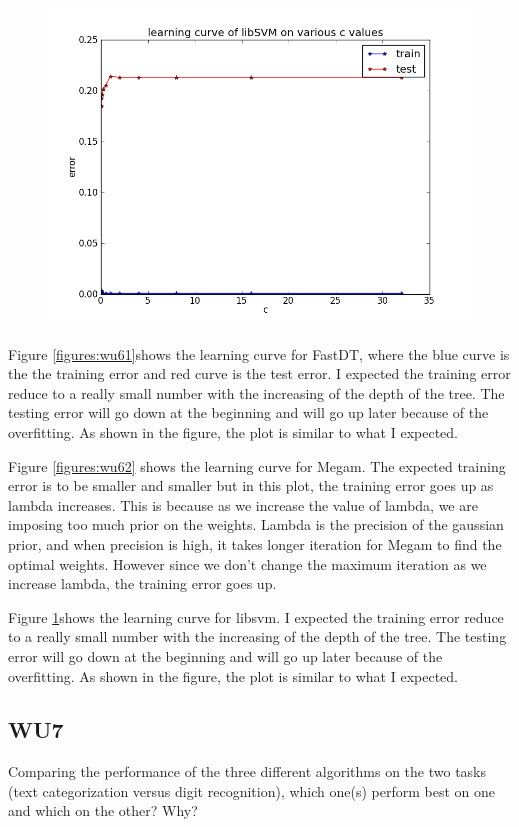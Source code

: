 \documentclass[a4paper,11pt]{article}
\begin{document}
\begin{figure}[!ht]
  \begin{center}
  \includegraphics[width=4.5in]{WU6/learningCurve_libsvm.png}
    \label{figures:wu63}
  \end{center}
\end{figure}

Figure \ref{figures:wu61}shows the learning curve for FastDT, where the blue curve is the the training error and red curve is the test error. I expected the training error reduce to a really small number with the increasing of the depth of the tree. The testing error will go down at the beginning and will go up later because of the overfitting. As shown in the figure, the plot is similar to what I expected.

Figure  \ref{figures:wu62} shows the learning curve for Megam. The
expected training error is to be smaller and smaller but in this plot,
the training error goes up as lambda increases. This is because as we
increase the value of lambda, we are imposing too much prior on the
weights. Lambda is the precision of the gaussian prior, and when
precision is high, it takes longer iteration for Megam to find the
optimal weights. However since we don't change the maximum iteration as we
increase lambda, the training error goes up.

Figure \ref{figures:wu63}shows the learning curve for libsvm.  I expected the training error reduce to a really small number with the increasing of the depth of the tree. The testing error will go down at the beginning and will go up later because of the overfitting. As shown in the figure, the plot is similar to what I expected.


\subsection{WU7}
\textsf{Comparing the performance of the three different algorithms 
on the two tasks (text categorization versus digit recognition), 
which one(s) perform best on one and which on the other? Why?}\\
\end{document}

